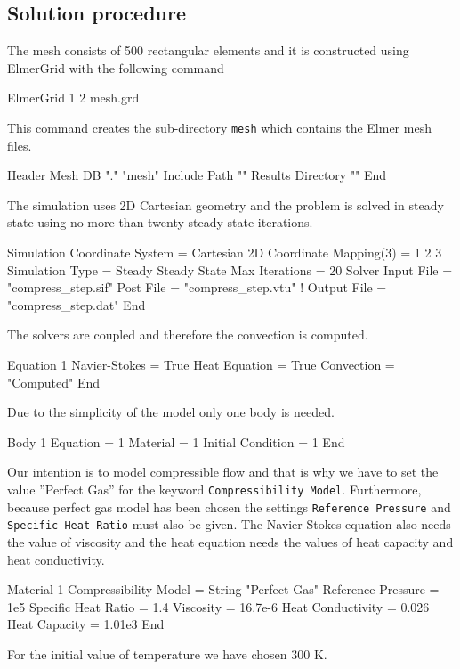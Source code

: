 \subsection*{Solution procedure}

\begin{flushleft}

The mesh consists of 500 rectangular elements and it is constructed using ElmerGrid with the following command

\ttbegin
ElmerGrid 1 2 mesh.grd
\ttend

This command creates the sub-directory {\tt mesh} which contains the Elmer mesh files.

\ttbegin
Header
  Mesh DB "." "mesh"
  Include Path ""
  Results Directory ""
End
\ttend

The simulation uses 2D Cartesian geometry and the problem is solved in steady state using no more than twenty steady state iterations.

\ttbegin
Simulation
  Coordinate System =  Cartesian 2D
  Coordinate Mapping(3) = 1 2 3
  Simulation Type = Steady
  Steady State Max Iterations = 20
  Solver Input File = "compress_step.sif"
  Post File = "compress_step.vtu"
!  Output File = "compress_step.dat"
End
\ttend

The solvers are coupled and therefore the convection is computed. 

\ttbegin
Equation 1
  Navier-Stokes = True
  Heat Equation = True
  Convection = "Computed"
End
\ttend

Due to the simplicity of the model only one body is needed.

\ttbegin
Body 1
  Equation = 1
  Material = 1
  Initial Condition = 1
End
\ttend

Our intention is to model compressible flow and that is why we have to set the value ''Perfect Gas'' for the keyword {\tt Compressibility Model}. Furthermore, because perfect gas model has been chosen the settings {\tt Reference Pressure} and {\tt Specific Heat Ratio} must also be given. The Navier-Stokes equation also needs the value of viscosity and the heat equation needs the values of heat capacity and heat conductivity.

\ttbegin
Material 1
  Compressibility Model = String "Perfect Gas"
  Reference Pressure = 1e5
  Specific Heat Ratio = 1.4
  Viscosity = 16.7e-6
  Heat Conductivity = 0.026
  Heat Capacity = 1.01e3
End
\ttend

For the initial value of temperature we have chosen 300 K.


\end{flushleft}
